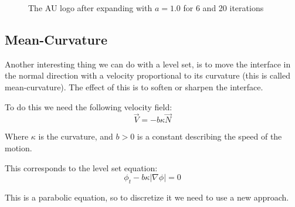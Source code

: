 \begin{figure}[h]
  \centering
  \caption{The AU logo after expanding with $a=1.0$ for 6 and 20 iterations}
  \label{fig:auGrow}
\end{figure}


\subsection{Mean-Curvature}

Another interesting thing we can do with a level set, is to move the
interface in the normal direction with a velocity proportional to its
curvature (this is called mean-curvature). The effect of this is to
soften or sharpen the interface.

To do this we need the following velocity field:
\begin{equation}
  \vec{V} = -b\kappa\vec{N}
\end{equation}

Where $\kappa$ is the curvature, and $b>0$ is a constant describing the
speed of the motion. %

This corresponds to the level set equation: 
\begin{equation}
  \phi_t -b\kappa|\nabla\phi| = 0
\end{equation}

This is a parabolic equation, so to discretize it we need to use a new
approach. 

